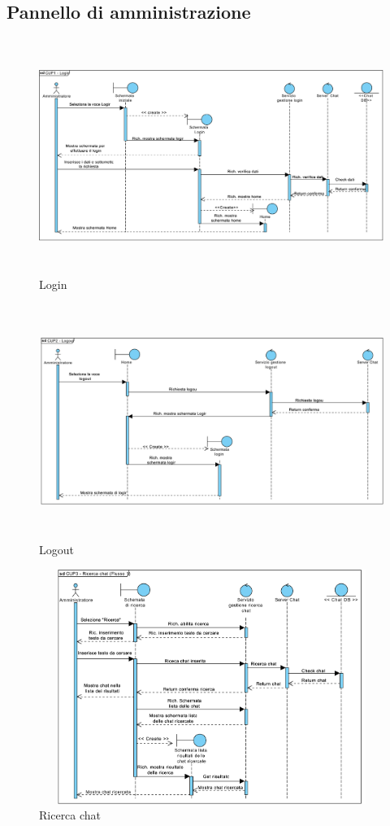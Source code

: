 \pagebreak
\subsection{Pannello di amministrazione}

\begin{figure}
	\centering
	\includegraphics[height=3in,width=5in]{imgs/gruppo6/sequence/CUP1_Login.pdf}
	\caption{Login}
	\label{fig:prova}
\end{figure}

\begin{figure}
	\centering
	\includegraphics[height=3in,width=5in]{imgs/gruppo6/sequence/CUP2_logout.pdf}
	\caption{Logout}
	\label{fig:prova}
\end{figure}

\begin{figure}
	\centering
	\includegraphics[height=3in,width=5in]{imgs/gruppo6/sequence/CUP3_ricerca_chat_flusso_1.pdf}
	\caption{Ricerca chat}
	\label{fig:prova}
\end{figure}

